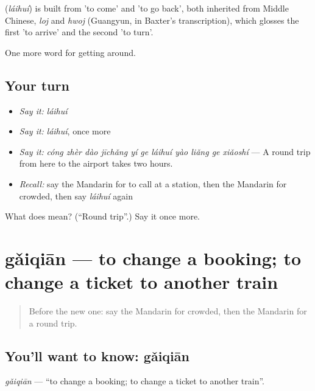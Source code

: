 \begin{cousinweb}
\textbf{} (\emph{láihuí}) is built from  'to come' and  'to go back', both inherited from Middle Chinese, \emph{loj} and \emph{hwoj} (Guangyun, in Baxter's transcription), which glosses the first 'to arrive' and the second 'to turn'.
\end{cousinweb}

\begin{grammarlens}[title={What you've built}]
One more word for getting around.
\end{grammarlens}

\subsection*{Your turn}
\begin{itemize}
\raggedright
  \item \emph{Say it:} \emph{láihuí}
  \item \emph{Say it:} \emph{láihuí}, once more
  \item \emph{Say it:} \emph{cóng zhèr dào jīchǎng yí ge láihuí yào liǎng ge xiǎoshí} — A round trip from here to the airport takes two hours.
  \item \emph{Recall:} say the Mandarin for to call at a station, then the Mandarin for crowded, then say \emph{láihuí} again
\end{itemize}

\begin{tcolorbox}[breakable,colback=teal!4,colframe=teal!35!black,title={Before you move on}]
What does  mean? (\textquotedblleft{}Round trip\textquotedblright{}.) Say it once more.
\end{tcolorbox}
\section[gǎiqiān]{gǎiqiān — to change a booking; to change a ticket to another train}

\label{lesson:ZH-C406-gaiqian}



\begin{quote}
Before the new one: say the Mandarin for crowded, then the Mandarin for a round trip.
\end{quote}

\subsection*{You'll want to know: gǎiqiān}
\emph{gǎiqiān} — \textquotedblleft{}to change a booking; to change a ticket to another train\textquotedblright{}.

